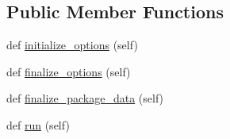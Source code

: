 \subsection*{Public Member Functions}
\begin{DoxyCompactItemize}
\item 
def \hyperlink{classsetuptools_1_1__distutils_1_1command_1_1bdist__rpm_1_1bdist__rpm_a06db5fd2efb7938d6ed18c595eeb3324}{initialize\+\_\+options} (self)
\item 
def \hyperlink{classsetuptools_1_1__distutils_1_1command_1_1bdist__rpm_1_1bdist__rpm_ada7e418cd2bdcd0e23571bc6a41b38de}{finalize\+\_\+options} (self)
\item 
def \hyperlink{classsetuptools_1_1__distutils_1_1command_1_1bdist__rpm_1_1bdist__rpm_a3615f97dbe7dd67462916b949827eb93}{finalize\+\_\+package\+\_\+data} (self)
\item 
def \hyperlink{classsetuptools_1_1__distutils_1_1command_1_1bdist__rpm_1_1bdist__rpm_a35e31868300bbdbbf0bf38d2e3abb103}{run} (self)
\end{DoxyCompactItemize}
